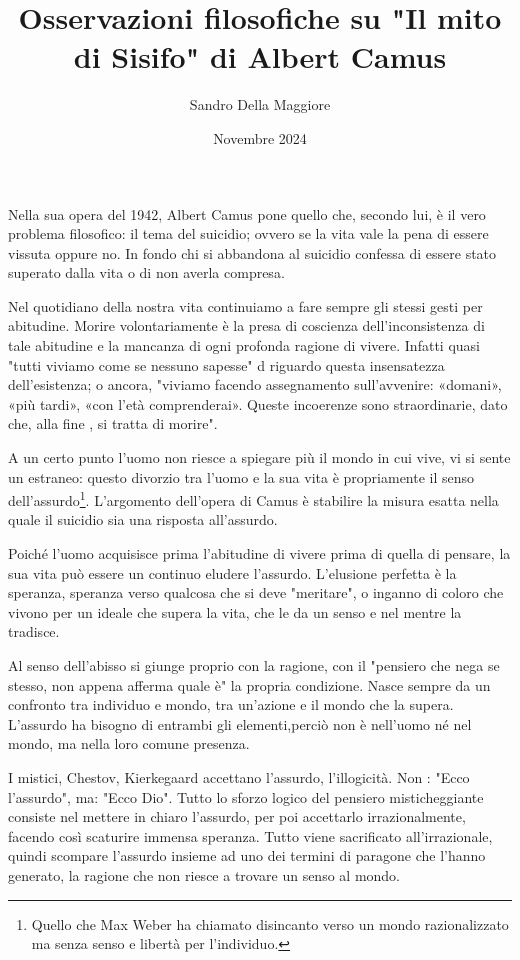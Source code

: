 \documentclass[a4paper,12pt,oneside]{article}%
\begin{document}
	\author{Sandro Della Maggiore}
	\title{Osservazioni filosofiche su "Il mito di Sisifo" di Albert Camus}
	\date{Novembre 2024}
	
	\maketitle
	
Nella sua opera del 1942, Albert Camus pone quello che, secondo lui, è il vero problema filosofico: il tema del suicidio; ovvero se la vita vale la pena di essere vissuta	oppure no. In fondo chi si abbandona al suicidio confessa di essere stato superato dalla vita o di non averla compresa.

Nel quotidiano della nostra vita continuiamo a fare sempre gli stessi gesti per abitudine. Morire volontariamente è la presa di coscienza dell'inconsistenza di tale abitudine e la mancanza di ogni profonda ragione di vivere. Infatti quasi "tutti viviamo come se nessuno sapesse" d riguardo questa insensatezza dell'esistenza; o ancora, "viviamo facendo assegnamento sull'avvenire: «domani», «più tardi», «con l'età comprenderai». Queste incoerenze sono straordinarie, dato che, alla fine , si tratta di morire".

A un certo punto l'uomo non riesce a spiegare più il mondo in cui vive, vi si sente un estraneo: questo divorzio tra l'uomo e la sua vita è propriamente il senso dell'assurdo\footnote{Quello che Max Weber ha chiamato disincanto verso un mondo razionalizzato ma senza  senso e libertà per l'individuo.}. L'argomento dell'opera di Camus è stabilire la misura esatta nella quale il suicidio sia una risposta all'assurdo.

Poiché l'uomo acquisisce prima l'abitudine di vivere prima di quella di pensare, la sua vita può essere un continuo eludere l'assurdo. L'elusione perfetta è la speranza, speranza verso qualcosa che si deve "meritare", o inganno di coloro che vivono per un ideale che supera la vita, che le da un senso e nel mentre la tradisce.

Al senso dell'abisso si giunge proprio con la ragione, con il "pensiero che nega se stesso, non appena afferma quale è" la propria condizione. Nasce sempre da un confronto tra individuo e mondo, tra un'azione e il mondo che la supera. L'assurdo ha bisogno di entrambi gli elementi,perciò non è nell'uomo né nel mondo, ma nella loro comune presenza.

I mistici, Chestov, Kierkegaard accettano l'assurdo, l'illogicità. Non : "Ecco l'assurdo", ma: "Ecco Dio". Tutto lo sforzo logico del pensiero misticheggiante consiste nel mettere in chiaro l'assurdo, per poi accettarlo irrazionalmente, facendo così scaturire immensa speranza. Tutto viene sacrificato all'irrazionale, quindi scompare l'assurdo insieme ad uno dei termini di paragone che l'hanno generato, la ragione che non riesce a trovare un senso al mondo.
\end{document}
